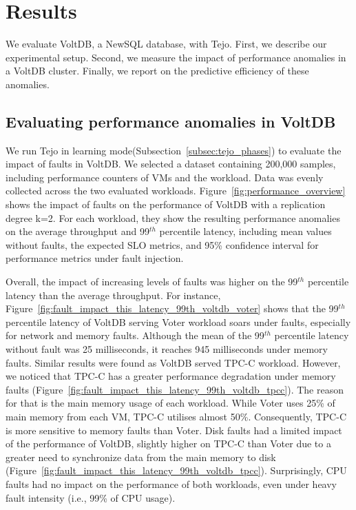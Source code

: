 
\section{Results}
\label{sec:evaluation}


We evaluate VoltDB, a NewSQL database, with Tejo. First, we describe our experimental setup. Second, we measure the impact of performance anomalies in a VoltDB cluster. Finally, we report on the predictive efficiency of these anomalies.


\subsection{Evaluating performance anomalies in VoltDB}
\label{subsec:performance}

We run Tejo in learning mode(Subsection~\ref{subsec:tejo_phases}) to evaluate the impact of faults in VoltDB. We selected a dataset containing 200,000 samples, including performance counters of VMs and the workload. Data was evenly collected across the two evaluated workloads. Figure~\ref{fig:performance_overview} shows the impact of faults on the performance of VoltDB with a replication degree k=2. For each workload, they show the resulting performance anomalies on the average throughput and 99$^{th}$ percentile latency, including mean values without faults, the expected SLO metrics, and 95\% confidence interval for performance metrics under fault injection. 

Overall, the impact of increasing levels of faults was higher on the 99$^{th}$ percentile latency than the average throughput. For instance, Figure~\ref{fig:fault_impact_this_latency_99th_voltdb_voter} shows that the 99$^{th}$ percentile latency of VoltDB serving Voter workload soars under faults, especially for network and memory faults. Although the mean of the 99$^{th}$ percentile latency without fault was 25 milliseconds, it reaches 945 milliseconds under memory faults. Similar results were found as VoltDB served TPC-C workload. However, we noticed that TPC-C has a greater performance degradation under memory faults (Figure~\ref{fig:fault_impact_this_latency_99th_voltdb_tpcc}). The reason for that is the main memory usage of each workload. While Voter uses 25\% of main memory from each VM, TPC-C utilises almost 50\%. Consequently, TPC-C is more sensitive to memory faults than Voter. Disk faults had a limited impact of the performance of VoltDB, slightly higher on TPC-C than Voter due to a greater need to synchronize data from the main memory to disk (Figure~\ref{fig:fault_impact_this_latency_99th_voltdb_tpcc}). Surprisingly, CPU faults had no impact on the performance of both workloads, even under heavy fault intensity (i.e., 99\% of CPU usage). 

